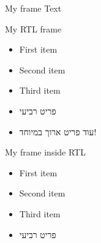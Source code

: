 \useoutertheme[right]{}

    
    \newenvironment{hframe}[0]{\begin{frame}\setRL}{\end{frame}}
    \newcommand{\hframetitle}[1]{\frametitle{\hfill\RL{#1}}}
    \newcommand{\hframesubtitle}[1]{\framesubtitle{\hfill\RL{#1}}}
    \newcommand{\hsection}[1]{\section{\RL{#1}}}
    \newcommand{\hsubsection}[1]{\subsection{\RL{#1}}}
    \newcommand{\hsubsubsection}[1]{\subsubsection{\RL{#1}}}
    \newtheorem{hclaim}[theorem]{}
    
    
    
		
		\begin{frame}{My frame}
			Text
		\end{frame}

		\begin{frame}{My RTL  frame}
		\begin{RTL}
			\begin{itemize}
				\item First item 
				\item Second item 
				\item Third item 
				\item
פריט רביעי
        \item עוד פריט ארוך במיוחד!
			\end{itemize}
		\end{RTL}
		\end{frame}

		\begin{RTL}
		\begin{frame}{My frame inside RTL}
			\begin{itemize}
				\item First item 
				\item Second item 
				\item Third item 
				\item פריט רביעי
			\end{itemize}
		\end{frame}
		\end{RTL}

